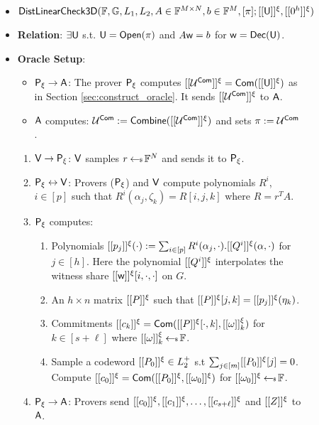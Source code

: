 \begin{figure}[h!]
\centering
\begin{framed}
\begin{itemize}
\item {$\mathsf{DistLinearCheck3D}(\mathbb{F},\mathbb{G},L_1,L_2,A\in \mathbb{F}^{M\times N},b\in
\mathbb{F}^M,[\pi];[[{\mathsf{U}}]]^\xi,[[{0^h}]]^\xi)$}
\item {\bf Relation}: $\exists \mathsf{U}$ s.t. $\mathsf{U}=\mathsf{Open}(\pi)$ and $A\mathsf{w} = b$
for $\mathsf{w}=\mathsf{Dec}(\mathsf{U})$.
\item {\bf Oracle Setup}: 
	\begin{itemize}
	\item $\mathsf{P}_\xi\rightarrow\mathsf{A}$: The prover $\mathsf{P}_\xi$ computes
$[[{\mathcal{U}^{\mathsf{Com}}}]]^\xi = \mathsf{Com}([[{\mathsf{U}}]]^\xi)$ as in Section
\ref{sec:construct_oracle}. It sends $[[{\mathcal{U}^{\mathsf{Com}}}]]^\xi$ to $\mathsf{A}$. 
	\item {\color{red} $\mathsf{A}$ computes: $\mathcal{U}^{\mathsf{Com}} := \mathsf{Combine}([[{\mathcal{U}^{\mathsf{Com}}}]]^\xi)$ and
sets $\pi := \mathcal{U}^{\mathsf{Com}}$}.
	\end{itemize}
\begin{enumerate}[{\rm 1.}]
\item $\mathsf{V}\rightarrow\mathsf{P}_\xi$: $\mathsf{V}$ samples $r\hskip2.3pt{\gets\!\!\mbox{\tiny${\$}$\normalsize}}\, \mathbb{F}^N$ and
sends it to $\mathsf{P}_\xi$.
\item $\mathsf{P}_\xi\leftrightarrow\mathsf{V}$: Provers ($\mathsf{P}_\xi$) and $\mathsf{V}$
compute polynomials $R^i$, $i\in [p]$ such that
$R^i(\alpha_j,\zeta_k)=R[i,j,k]$ where $R=r^TA$. 
\item $\mathsf{P}_\xi$ computes:
	\begin{enumerate}
	\item Polynomials $[[{p_j}]]^\xi(\cdot) := \sum_{i\in
[p]}R^i(\alpha_j,\cdot).[[{Q^i}]]^\xi(\alpha,\cdot)$ for $j\in [h]$. Here the
polynomial $[[{Q^i}]]^\xi$ interpolates the witness share
$[[{\mathsf{w}}]]^\xi[i,\cdot,\cdot]$ on $G$.
	\item An $h\times n$ matrix $[[{P}]]^\xi$ such that $[[{P}]]^\xi[j,k]=[[{p_j}]]^\xi(\eta_k)$.
	\item Commitments $[[{c_k}]]^\xi=\mathsf{Com}([[{P}]]^\xi[\cdot,k],[[{\omega}]]^\xi_k)$ for $k\in [s+\ell]$
where $[[{\omega}]]^\xi_k\hskip2.3pt{\gets\!\!\mbox{\tiny${\$}$\normalsize}}\, \mathbb{F}$.
	\item Sample a codeword $[[{P_0}]]^\xi\in L^{+}_2$ s.t $\sum_{j\in
[m]}[[{P_0}]]^\xi[j]=0$.
Compute $[[{c_0}]]^\xi=\mathsf{Com}([[{P_0}]]^\xi,[[{\omega_0}]]^\xi)$ for $[[{\omega_0}]]^\xi\hskip2.3pt{\gets\!\!\mbox{\tiny${\$}$\normalsize}}\, \mathbb{F}$.
	\end{enumerate}
\item $\mathsf{P}_\xi\rightarrow\mathsf{A}$: Provers send
$[[{c_0}]]^\xi,[[{c_1}]]^\xi,\ldots,[[{c_{s+\ell}}]]^\xi$ and $[[{Z}]]^\xi$ to $\mathsf{A}$.


\end{enumerate}
\end{itemize}
\end{framed}
\end{figure}
